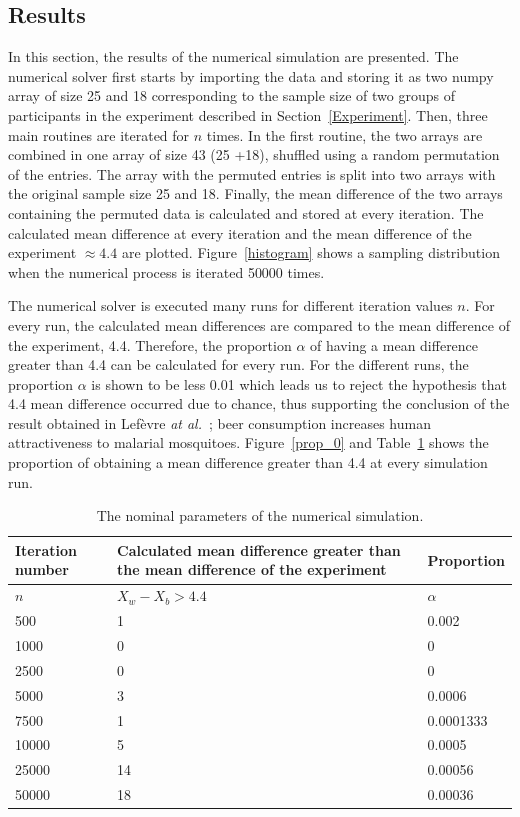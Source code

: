\subsection{Results}\label{results}

In this section, the results of the numerical simulation are presented. The numerical solver first starts by importing the data and storing it as two numpy array of size 25 and 18 corresponding to the sample size of two groups of participants in the experiment described in Section~\ref{Experiment}. Then, three main routines are iterated for $n$ times. In the first routine, the two arrays are combined in one array of size 43 (25 +18), shuffled using a random permutation of the entries. The array with the permuted entries is split into two arrays with the original sample size 25 and 18. Finally, the mean difference of the two arrays containing the permuted data is calculated and stored at every iteration.
The calculated mean difference at every iteration and the mean difference of the experiment $\approx{4.4}$ are plotted. Figure~\ref{histogram} shows a sampling distribution when the numerical process is iterated 50000 times.

The numerical solver is executed many runs for different iteration values $n$. For every run, the calculated mean differences are compared to the mean difference of the experiment, 4.4. Therefore, the proportion $\alpha$ of having a mean difference greater than 4.4 can be calculated for every run. For the different runs, the proportion $\alpha$ is shown to be less 0.01 which leads us to reject the hypothesis that 4.4 mean difference occurred due to chance, thus supporting the conclusion of the result obtained in Lef\`evre \textit{at al.}~\cite{lefevre2010beer}; beer consumption increases human attractiveness to malarial mosquitoes. Figure~\ref{prop_0} and Table~\ref{result} shows the proportion of obtaining a mean difference greater than 4.4 at every simulation run.
\begin{table}[h]
\begin{center}
\caption{The nominal parameters of the numerical simulation.\label{result}}
\begin{tabular}{p{2cm}|p{7.5cm}|l}
\hline\hline Iteration number  & Calculated mean difference greater than the mean difference of the experiment   & Proportion \\
\hline $n$ & $X_w-X_b > 4.4 $ & $\alpha$ \\ \hline
500     & 1 & 0.002 \\
1000    & 0 & 0     \\
2500    & 0 & 0     \\
5000    & 3 & 0.0006\\
7500    & 1 & 0.0001333 \\
10000   & 5 &  0.0005   \\
25000   & 14&  0.00056 \\
50000   & 18&  0.00036 \\ \hline
 \end{tabular} \end{center} \end{table}

